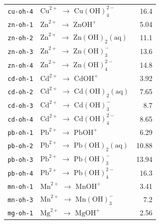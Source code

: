 \documentclass[a4paper,11pt]{ltxdoc}
\begin{document}
\begin{longtable}{@{}>{\raggedright\arraybackslash}p{42mm}p{87mm}r@{}}
\texttt{cu-oh-4} & $\mathrm{Cu}^{2+}$ $\to$ $\mathrm{Cu}(\mathrm{O}\mathrm{H})_{4}^{2-}$ & 16.4\\
\texttt{zn-oh-1} & $\mathrm{Zn}^{2+}$ $\to$ $\mathrm{Zn}\mathrm{O}\mathrm{H}^{+}$ & 5.04\\
\texttt{zn-oh-2} & $\mathrm{Zn}^{2+}$ $\to$ $\mathrm{Zn}(\mathrm{O}\mathrm{H})_{2}\mathrm{(aq)}$ & 11.1\\
\texttt{zn-oh-3} & $\mathrm{Zn}^{2+}$ $\to$ $\mathrm{Zn}(\mathrm{O}\mathrm{H})_{3}^{-}$ & 13.6\\
\texttt{zn-oh-4} & $\mathrm{Zn}^{2+}$ $\to$ $\mathrm{Zn}(\mathrm{O}\mathrm{H})_{4}^{2-}$ & 14.8\\
\texttt{cd-oh-1} & $\mathrm{Cd}^{2+}$ $\to$ $\mathrm{Cd}\mathrm{O}\mathrm{H}^{+}$ & 3.92\\
\texttt{cd-oh-2} & $\mathrm{Cd}^{2+}$ $\to$ $\mathrm{Cd}(\mathrm{O}\mathrm{H})_{2}\mathrm{(aq)}$ & 7.65\\
\texttt{cd-oh-3} & $\mathrm{Cd}^{2+}$ $\to$ $\mathrm{Cd}(\mathrm{O}\mathrm{H})_{3}^{-}$ & 8.7\\
\texttt{cd-oh-4} & $\mathrm{Cd}^{2+}$ $\to$ $\mathrm{Cd}(\mathrm{O}\mathrm{H})_{4}^{2-}$ & 8.65\\
\texttt{pb-oh-1} & $\mathrm{Pb}^{2+}$ $\to$ $\mathrm{Pb}\mathrm{O}\mathrm{H}^{+}$ & 6.29\\
\texttt{pb-oh-2} & $\mathrm{Pb}^{2+}$ $\to$ $\mathrm{Pb}(\mathrm{O}\mathrm{H})_{2}\mathrm{(aq)}$ & 10.88\\
\texttt{pb-oh-3} & $\mathrm{Pb}^{2+}$ $\to$ $\mathrm{Pb}(\mathrm{O}\mathrm{H})_{3}^{-}$ & 13.94\\
\texttt{pb-oh-4} & $\mathrm{Pb}^{2+}$ $\to$ $\mathrm{Pb}(\mathrm{O}\mathrm{H})_{4}^{2-}$ & 16.3\\
\texttt{mn-oh-1} & $\mathrm{Mn}^{2+}$ $\to$ $\mathrm{Mn}\mathrm{O}\mathrm{H}^{+}$ & 3.41\\
\texttt{mn-oh-3} & $\mathrm{Mn}^{2+}$ $\to$ $\mathrm{Mn}(\mathrm{O}\mathrm{H})_{3}^{-}$ & 7.2\\
\texttt{mg-oh-1} & $\mathrm{Mg}^{2+}$ $\to$ $\mathrm{Mg}\mathrm{O}\mathrm{H}^{+}$ & 2.56\\
\end{longtable}
\end{document}
